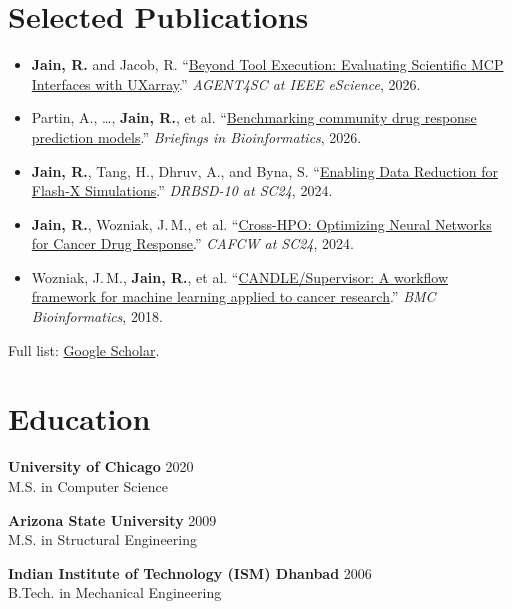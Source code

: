 \documentclass[10pt,letterpaper]{article}
\begin{document}
\section{Selected Publications}
\begin{itemize}
  \item \textbf{Jain, R.} and Jacob, R. ``\href{https://agent4sc.github.io/}{Beyond Tool Execution: Evaluating Scientific MCP Interfaces with UXarray}.'' \textit{AGENT4SC at IEEE eScience}, 2026.
  \item Partin, A., \ldots, \textbf{Jain, R.}, et al. ``\href{https://academic.oup.com/bib/article/27/1/bbaf667/7002013}{Benchmarking community drug response prediction models}.'' \textit{Briefings in Bioinformatics}, 2026.
  \item \textbf{Jain, R.}, Tang, H., Dhruv, A., and Byna, S. ``\href{https://doi.org/10.1109/SCW63240.2024.00043}{Enabling Data Reduction for Flash-X Simulations}.'' \textit{DRBSD-10 at SC24}, 2024.
  \item \textbf{Jain, R.}, Wozniak, J.\,M., et al. ``\href{https://web.cels.anl.gov/~woz/papers/IMPROVE_HPO_2024.pdf}{Cross-HPO: Optimizing Neural Networks for Cancer Drug Response}.'' \textit{CAFCW at SC24}, 2024.
  \item Wozniak, J.\,M., \textbf{Jain, R.}, et al. ``\href{https://bmcbioinformatics.biomedcentral.com/articles/10.1186/s12859-018-2508-4}{CANDLE/Supervisor: A workflow framework for machine learning applied to cancer research}.'' \textit{BMC Bioinformatics}, 2018.
\end{itemize}
Full list: \href{https://scholar.google.com/citations?user=bC77n9MAAAAJ}{Google Scholar}.

\section{Education}
\textbf{University of Chicago} \hfill 2020 \\
M.S. in Computer Science

\vspace{4pt}
\textbf{Arizona State University} \hfill 2009 \\
M.S. in Structural Engineering

\vspace{4pt}
\textbf{Indian Institute of Technology (ISM) Dhanbad} \hfill 2006 \\
B.Tech. in Mechanical Engineering
\end{document}
